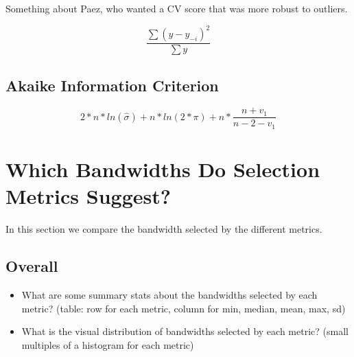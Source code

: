 \documentclass{article}
\begin{document}
Something about Paez, who wanted a CV score that was more robust to outliers.

\begin{equation}\label{eq:SCV}
\frac{\sum (y - y_{-i})^2} {\sum y}
\end{equation}

\subsection{Akaike Information Criterion}

\begin{equation}\label{eq:AIC}
  2*n*ln(\hat{\sigma}) + n*ln(2*\pi) + 
    n*\frac{n + v_1}{n - 2 - v_1}
    \end{equation}
    
\section{Which Bandwidths Do Selection Metrics Suggest?}

In this section we compare the bandwidth selected by the different metrics.

\subsection{Overall}

\begin{itemize}
\item What are some summary stats about the bandwidths selected by each metric? (table: row for each metric, column for min, median, mean, max, sd)
\item What is the visual distribution of bandwidths selected by each metric? (small multiples of a histogram for each metric)
\end{itemize}
\end{document}
